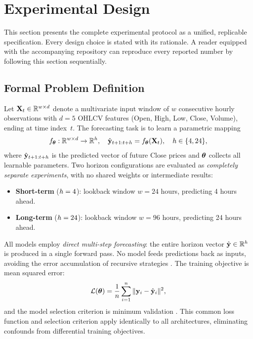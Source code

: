 \section{Experimental Design}
\label{sec:experimental_design}

This section presents the complete experimental protocol as a unified, replicable specification.  Every design choice is stated with its rationale.  A reader equipped with the accompanying repository can reproduce every reported number by following this section sequentially.

\subsection{Formal Problem Definition}
\label{sec:problem_definition}

Let $\mathbf{X}_t \in \mathbb{R}^{w \times d}$ denote a multivariate input window of $w$ consecutive hourly observations with $d = 5$ OHLCV features (Open, High, Low, Close, Volume), ending at time index~$t$.  The forecasting task is to learn a parametric mapping
\begin{equation}
  f_{\boldsymbol{\theta}}: \mathbb{R}^{w \times d} \rightarrow \mathbb{R}^{h},
  \quad \hat{\mathbf{y}}_{t+1:t+h} = f_{\boldsymbol{\theta}}(\mathbf{X}_t),
  \quad h \in \{4, 24\},
  \label{eq:task}
\end{equation}
where $\hat{\mathbf{y}}_{t+1:t+h}$ is the predicted vector of future Close prices and $\boldsymbol{\theta}$ collects all learnable parameters.  Two horizon configurations are evaluated as \emph{completely separate experiments}, with no shared weights or intermediate results:

\begin{itemize}[nosep]
  \item \textbf{Short-term} ($h=4$): lookback window $w = 24$ hours, predicting 4 hours ahead.
  \item \textbf{Long-term} ($h=24$): lookback window $w = 96$ hours, predicting 24 hours ahead.
\end{itemize}

All models employ \emph{direct multi-step forecasting}: the entire horizon vector $\hat{\mathbf{y}} \in \mathbb{R}^h$ is produced in a single forward pass.  No model feeds predictions back as inputs, avoiding the error accumulation of recursive strategies \citep{Taieb2012, Chevillon2007}.  The training objective is mean squared error:
\begin{equation}
  \mathcal{L}(\boldsymbol{\theta}) = \frac{1}{n} \sum_{i=1}^{n} \|\mathbf{y}_i - \hat{\mathbf{y}}_i\|^2,
  \label{eq:loss}
\end{equation}
and the model selection criterion is minimum validation \mse.  This common loss function and selection criterion apply identically to all architectures, eliminating confounds from differential training objectives.


